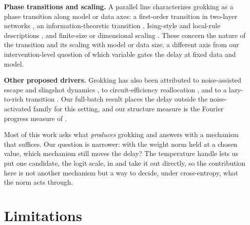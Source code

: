 \textbf{Phase transitions and scaling.} A parallel line characterizes grokking as a phase transition along
model or data axes: a first-order transition in two-layer networks \citep{rubin2024firstorder}, an
information-theoretic transition \citep{clauw2024infotheoretic}, Ising-style and local-rule descriptions
\citep{hutchison2025ising,zunkovic2024grokking}, and finite-size or dimensional scaling
\citep{bi2026finitesize,wang2026dimensional,wang2026criticality}. These concern the nature of the
transition and its scaling with model or data size, a different axis from our intervention-level question
of which variable gates the delay at fixed data and model.

\textbf{Other proposed drivers.} Grokking has also been attributed to noise-assisted escape and slingshot
dynamics \citep{thilak2022slingshot,lopatin2025predator}, to circuit-efficiency reallocation
\citep{nanda2023progress,varma2023circuit}, and to a lazy-to-rich transition
\citep{kumar2024grokking,lyu2020margin}. Our full-batch result places the delay outside the
noise-activated family for this setting, and our structure measure is the Fourier progress measure of
\citet{nanda2023progress}.

Most of this work asks what \emph{produces} grokking and answers with a mechanism that suffices. Our
question is narrower: with the weight norm held at a chosen value, which mechanism still moves the delay?
The temperature handle lets us put one candidate, the logit scale, in and take it out directly, so the
contribution here is not another mechanism but a way to decide, under cross-entropy, what the norm acts
through.

\section{Limitations}

